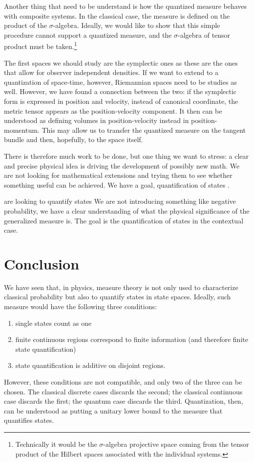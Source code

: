 \documentclass[10pt,twocolumn, nofootinbib]{revtex4-2}
\begin{document}
Another thing that need to be understand is how the quantized measure behaves with composite systems. In the classical case, the measure is defined on the product of the $\sigma$-algebra. Ideally, we would like to show that this simple procedure cannot support a quantized measure, and the $\sigma$-algebra of tensor product must be taken.\footnote{Technically it would be the $\sigma$-algebra projective space coming from the tensor product of the Hilbert spaces associated with the individual systems.}

The first spaces we should study are the symplectic ones as these are the ones that allow for observer independent densities. If we want to extend to a quantization of space-time, however, Riemannian spaces need to be studies as well. However, we have found a connection between the two: if the symplectic form is expressed in position and velocity, instead of canonical coordinate, the metric tensor appears as the position-velocity component. It then can be understood as defining volumes in position-velocity instead in position-momentum. This may allow us to transfer the quantized measure on the tangent bundle and then, hopefully, to the space itself.

There is therefore much work to be done, but one thing we want to stress: a clear and precise physical idea is driving the development of possibly new math. We are not looking for mathematical extensions and trying them to see whether something useful can be achieved. We have a goal, quantification of states .

 are looking to quantify states  We are not introducing something like negative probability, we have a clear understanding of what the physical significance of the generalized measure is. The goal is the quantification of states in the contextual case. 

\section{Conclusion}

We have seen that, in physics, measure theory is not only used to characterize classical probability but also to quantify states in state spaces. Ideally, such measure would have the following three conditions:
\begin{enumerate}
	\item single states count as one
	\item finite continuous regions correspond to finite information (and therefore finite state quantification)
	\item state quantification is additive on disjoint regions.
\end{enumerate}
However, these conditions are not compatible, and only two of the three can be chosen. The classical discrete cases discards the second; the classical continuous case discards the first; the quantum case discards the third. Quantization, then, can be understood as putting a unitary lower bound to the measure that quantifies states.
\end{document}

